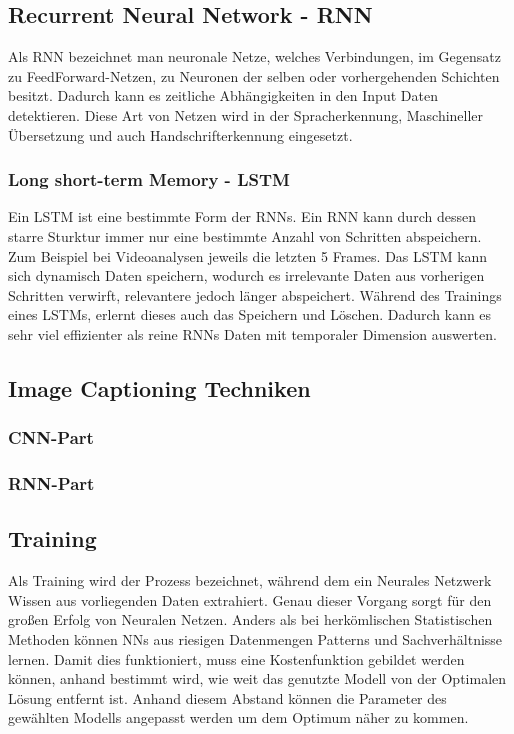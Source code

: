 \documentclass[pdftex,a4paper,halfparskip]{scrartcl}
\begin{document}
\subsection{Recurrent Neural Network - RNN}

Als RNN bezeichnet man neuronale Netze, welches Verbindungen, im Gegensatz zu FeedForward-Netzen, zu Neuronen der selben oder vorhergehenden Schichten besitzt. Dadurch kann es zeitliche Abhängigkeiten in den Input Daten detektieren. Diese Art von Netzen wird in der Spracherkennung, Maschineller Übersetzung und auch Handschrifterkennung eingesetzt. 


\subsubsection{Long short-term Memory - LSTM}

Ein LSTM ist eine bestimmte Form der RNNs. Ein RNN kann durch dessen starre Sturktur immer nur eine bestimmte Anzahl von Schritten abspeichern. Zum Beispiel bei Videoanalysen jeweils die letzten 5 Frames. Das LSTM kann sich dynamisch Daten speichern, wodurch es irrelevante Daten aus vorherigen Schritten verwirft, relevantere jedoch länger abspeichert. Während des Trainings eines LSTMs, erlernt dieses auch das Speichern und Löschen. Dadurch kann es sehr viel effizienter als reine RNNs Daten mit temporaler Dimension auswerten. 

\subsection{Image Captioning Techniken}
\subsubsection{CNN-Part}
\subsubsection{RNN-Part}

\subsection{Training}

Als Training wird der Prozess bezeichnet, während dem ein Neurales Netzwerk Wissen aus vorliegenden Daten extrahiert. Genau dieser Vorgang sorgt für den großen Erfolg von Neuralen Netzen. Anders als bei herkömlischen Statistischen Methoden können NNs aus riesigen Datenmengen Patterns und Sachverhältnisse lernen. Damit dies funktioniert, muss eine Kostenfunktion gebildet werden können, anhand bestimmt wird, wie weit das genutzte Modell von der Optimalen Lösung entfernt ist. Anhand diesem Abstand können die Parameter des gewählten Modells angepasst werden um dem Optimum näher zu kommen.
\end{document}
